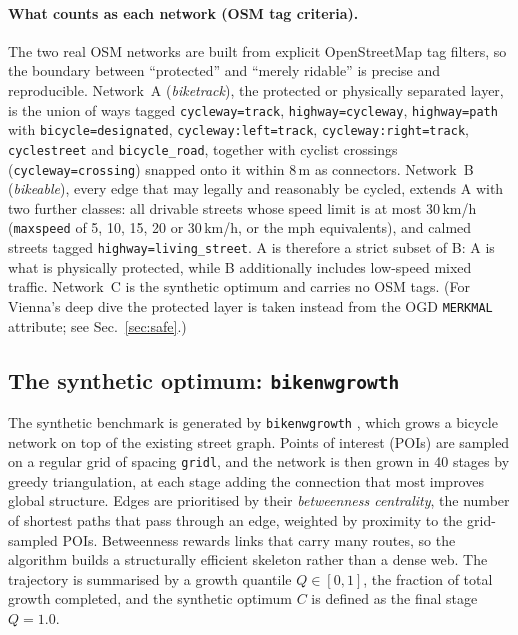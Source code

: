 \documentclass[11pt,a4paper]{article}
\begin{document}
\paragraph{What counts as each network (OSM tag criteria).} The two real OSM networks are
built from explicit OpenStreetMap tag filters, so the boundary between ``protected'' and
``merely ridable'' is precise and reproducible. Network~A (\emph{biketrack}), the protected
or physically separated layer, is the union of ways tagged \texttt{cycleway=track},
\texttt{highway=cycleway}, \texttt{highway=path} with \texttt{bicycle=designated},
\texttt{cycleway:left=track}, \texttt{cycleway:right=track}, \texttt{cyclestreet} and
\texttt{bicycle\_road}, together with cyclist crossings (\texttt{cycleway=crossing}) snapped
onto it within 8\,m as connectors. Network~B (\emph{bikeable}), every edge that may legally
and reasonably be cycled, extends A with two further classes: all drivable streets whose
speed limit is at most 30\,km/h (\texttt{maxspeed} of 5, 10, 15, 20 or 30\,km/h, or the mph
equivalents), and calmed streets tagged \texttt{highway=living\_street}. A is therefore a
strict subset of B: A is what is physically protected, while B additionally includes
low-speed mixed traffic. Network~C is the synthetic optimum and carries no OSM tags. (For
Vienna's deep dive the protected layer is taken instead from the OGD \texttt{MERKMAL}
attribute; see Sec.~\ref{sec:safe}.)

\subsection{The synthetic optimum: \texttt{bikenwgrowth}}

The synthetic benchmark is generated by \texttt{bikenwgrowth} \citep{szell2022}, which
grows a bicycle network on top of the existing street graph. Points of interest (POIs) are
sampled on a regular grid of spacing \texttt{gridl}, and the network is then grown in 40
stages by greedy triangulation, at each stage adding the connection that most improves
global structure. Edges are prioritised by their \emph{betweenness centrality}, the number
of shortest paths that pass through an edge, weighted by proximity to the grid-sampled
POIs. Betweenness rewards links that carry many routes, so the algorithm builds a
structurally efficient skeleton rather than a dense web. The trajectory is summarised by a
growth quantile \(Q\in[0,1]\), the fraction of total growth completed, and the synthetic
optimum \(C\) is defined as the final stage \(Q=1.0\).
\end{document}
